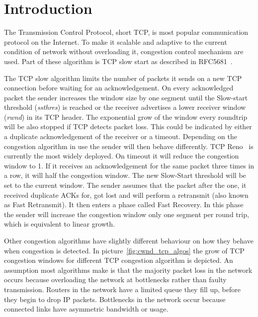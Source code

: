 \section{Introduction}
\label{sec:introduction}

The Transmission Control Protocol, short TCP, is most popular communication
protocol on the Internet. To make it scalable and adaptive to the current
condition of network without overloading it, congestion control mechanism are
used. Part of these algorithm is TCP slow start as described in
RFC5681~\cite{rfc5681}.

The TCP slow algorithm limits the number of packets it sends on a new TCP
connection before waiting for an acknowledgement. On every acknowledged packet
the sender increases the window size by one segment until the Slow-start
threshold (\emph{ssthres}) is reached  or the receiver advertises a lower
receiver window (\emph{rwnd}) in its TCP header. The exponential grow of the
window every roundtrip will be also stopped if TCP detects packet loss. This
could be indicated by either a duplicate acknowledgement of the receiver or a
timeout. Depending on the congestion algorithm in use the sender will then
behave differently. TCP Reno~\cite{rfc2581} is currently the most widely
deployed. On timeout it will reduce the congestion window to 1. If it receives
an acknowledgement for the same packet three times in a row, it will half the
congestion window. The new Slow-Start threshold will be set to the current
window. The sender assumes that the packet after the one, it received duplicate
ACKs for, got lost and will perform a retransmit (also known as Fast
Retransmit). It then enters a phase called Fast Recovery. In this phase the
sender will increase the congestion window only one segment per round trip,
which is equivalent to linear growth.

Other congestion algorithms have slightly different behaviour on how they behave
when congestion is detected. In picture~\ref{fig:cwnd_tcp_algos} the grow of TCP
congestion windows for different TCP congestion algorithm is depicted. An
assumption most algorithms make is that the majority packet loss in the network
occurs because overloading the network at bottlenecks rather than faulty
transmission. Routers in the network have a limited queue they fill up, before
they begin to drop IP packets. Bottlenecks in the network occur because
connected links have asymmetric bandwidth or usage.

